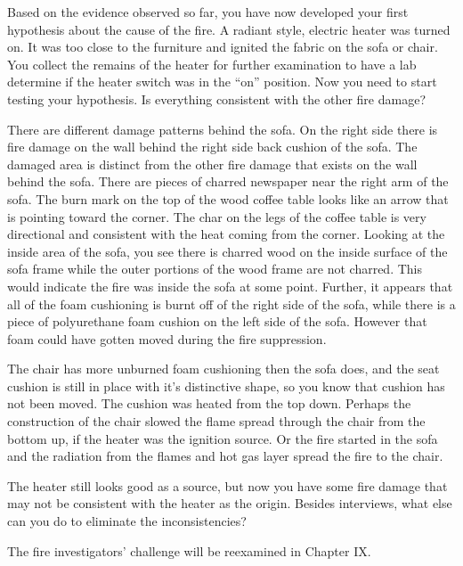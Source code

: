 \documentclass[twoside]{uocthesis}
\begin{document}
{Based on the evidence observed so far, you have now developed your first hypothesis about the cause of the fire.  A radiant style, electric heater was turned on.  It was too close to the furniture and ignited the fabric on the sofa or chair.  You collect the remains of the heater for further examination to have a lab determine if the heater switch was in the ``on'' position.  Now you need to start testing your hypothesis.  Is everything consistent with the other fire damage?  

There are different damage patterns behind the sofa.  On the right side there is fire damage on the wall behind the right side back cushion of the sofa. The damaged area is distinct from the other fire damage that exists on the wall behind the sofa. There are pieces of charred newspaper near the right arm of the sofa.  The burn mark on the top of the wood coffee table looks like an arrow that is pointing toward the corner.  The char on the legs of the coffee table is very directional and consistent with the heat coming from the corner.  Looking at the inside area of the sofa, you see there is charred wood on the inside surface of the sofa frame while the outer portions of the wood frame are not charred.  This would indicate the fire was inside the sofa at some point.  Further, it appears that all of the foam cushioning is burnt off of the right side of the sofa, while there is a piece of polyurethane foam cushion on the left side of the sofa.  However that foam could have gotten moved during the fire suppression. 

The chair has more unburned foam cushioning then the sofa does, and the seat cushion is still in place with it's distinctive shape, so you know that cushion has not been moved.  The cushion was heated from the top down.  Perhaps the construction of the chair slowed the flame spread through the chair from the bottom up, if the heater was the ignition source.  Or the fire started in the sofa and the radiation from the flames and hot gas layer spread the fire to the chair.  

The heater still looks good as a source, but now you have some fire damage that may not be consistent with the heater as the origin.  Besides interviews, what else can you do to eliminate the inconsistencies?   

The fire investigators' challenge will be reexamined in Chapter IX.     

}
\end{document}
